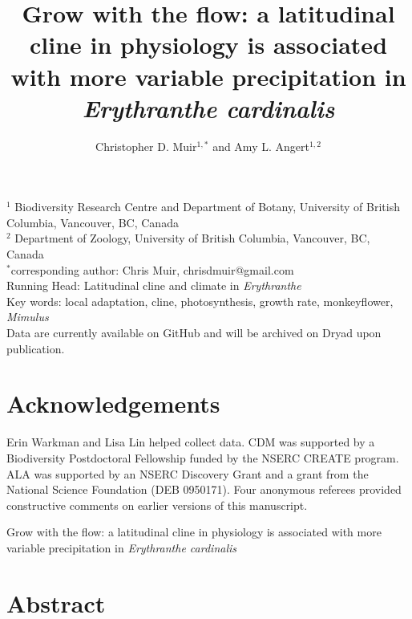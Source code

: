 \documentclass[11pt, oneside]{article}
\title{Grow with the flow: a latitudinal cline in physiology is associated with more variable precipitation in \textit{Erythranthe cardinalis}}
\author{Christopher D. Muir$^{1,*}$ and Amy L. Angert$^{1,2}$}
\date{}
\newcommand{\stretchy}{1.5}
\begin{document}

\maketitle

$^1$ Biodiversity Research Centre and Department of Botany, University of British Columbia, Vancouver, BC, Canada \\
$^2$ Department of Zoology, University of British Columbia, Vancouver, BC, Canada \\
$^*$corresponding author: Chris Muir, chrisdmuir@gmail.com \\

Running Head: Latitudinal cline and climate in \textit{Erythranthe} \\

Key words: local adaptation, cline, photosynthesis, growth rate, monkeyflower, \textit{Mimulus} \\

Data are currently available on GitHub and will be archived on Dryad upon publication. \\


\section*{Acknowledgements}
Erin Warkman and Lisa Lin helped collect data. CDM was supported by a Biodiversity Postdoctoral Fellowship funded by the NSERC CREATE program. ALA was supported by an NSERC Discovery Grant and a grant from the National Science Foundation (DEB 0950171). Four anonymous referees provided constructive comments on earlier versions of this manuscript.

\clearpage

\setstretch{\stretchy}

\begin{center}
{\LARGE  \centering Grow with the flow: a latitudinal cline in physiology is associated with more variable precipitation in \textit{Erythranthe cardinalis}}
\end{center}

\section*{Abstract}
\end{document}
